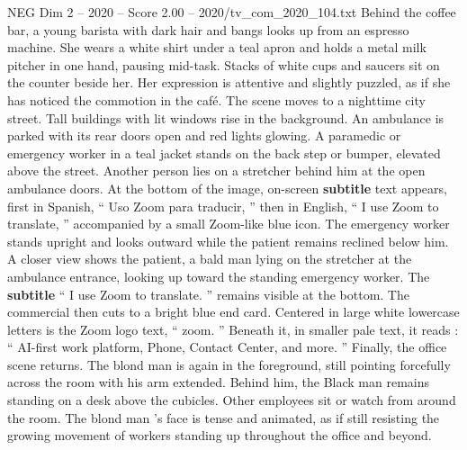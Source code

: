 \begin{textsample}{NEG Dim 2 – 2020 – Score 2.00 – 2020/tv\_com\_2020\_104.txt}
Behind the coffee bar, a young barista with dark hair and bangs looks up from an espresso machine.
She wears a white shirt under a teal apron and holds a metal milk pitcher in one hand, pausing mid-task.
Stacks of white cups and saucers sit on the counter beside her.
Her expression is attentive and slightly puzzled, as if she has noticed the commotion in the café.
The scene moves to a nighttime city street.
Tall buildings with lit windows rise in the background.
An ambulance is parked with its rear doors open and red lights glowing.
A paramedic or emergency worker in a teal jacket stands on the back step or bumper, elevated above the street.
Another person lies on a stretcher behind him at the open ambulance doors.
At the bottom of the image, on-screen \textbf{subtitle} text appears, first in Spanish, “ Uso Zoom para traducir, ” then in English, “ I use Zoom to translate, ” accompanied by a small Zoom-like blue icon.
The emergency worker stands upright and looks outward while the patient remains reclined below him.
A closer view shows the patient, a bald man lying on the stretcher at the ambulance entrance, looking up toward the standing emergency worker.
The \textbf{subtitle} “ I use Zoom to translate. ” remains visible at the bottom.
The commercial then cuts to a bright blue end card.
Centered in large white lowercase letters is the Zoom logo text, “ zoom. ” Beneath it, in smaller pale text, it reads : “ AI-first work platform, Phone, Contact Center, and more. ” Finally, the office scene returns.
The blond man is again in the foreground, still pointing forcefully across the room with his arm extended.
Behind him, the Black man remains standing on a desk above the cubicles.
Other employees sit or watch from around the room.
The blond man ’s face is tense and animated, as if still resisting the growing movement of workers standing up throughout the office and beyond.

\end{textsample}
